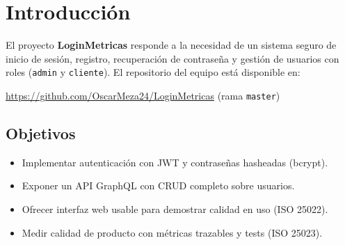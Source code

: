 \documentclass[11pt,a4paper]{article}
\newcommand{\repoUrl}{https://github.com/OscarMeza24/LoginMetricas}
\newcommand{\ramaRepo}{master}
\begin{document}
\begin{abstract}
Este documento sustenta un \emph{Minimum Viable Product} (MVP) de autenticación y administración de usuarios, desarrollado con \textbf{FastAPI}, \textbf{GraphQL (Strawberry)} y \textbf{React (Vite)}. La evaluación de calidad sigue el marco \textbf{SQuaRE}: la norma \textbf{ISO/IEC 25023:2016} (calidad del \emph{producto}) y la \textbf{ISO/IEC 25022:2016} (calidad \emph{en uso}). Se documentan arquitectura, operaciones CRUD, medidas cuantitativas, evidencia en código, protocolo de demostración y resultados de pruebas automatizadas (\textbf{29/29} tests exitosos).
\end{abstract}

\tableofcontents
\newpage

\section{Introducción}

El proyecto \textbf{LoginMetricas} responde a la necesidad de un sistema seguro de inicio de sesión, registro, recuperación de contraseña y gestión de usuarios con roles (\texttt{admin} y \texttt{cliente}). El repositorio del equipo está disponible en:

\begin{center}
  \url{\repoUrl} (rama \texttt{\ramaRepo})
\end{center}

\subsection{Objetivos}
\begin{itemize}[noitemsep]
  \item Implementar autenticación con JWT y contraseñas hasheadas (bcrypt).
  \item Exponer un API GraphQL con CRUD completo sobre usuarios.
  \item Ofrecer interfaz web usable para demostrar calidad en uso (ISO 25022).
  \item Medir calidad de producto con métricas trazables y tests (ISO 25023).
\end{itemize}
\end{document}
